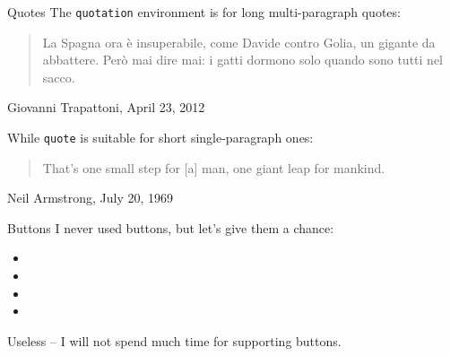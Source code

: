 \begin{frame}{Quotes}
The \texttt{quotation} environment is for long multi-paragraph quotes:

\begin{quotation}
La Spagna ora è insuperabile, come Davide contro Golia, un gigante da abbattere.
Però mai dire mai: i gatti dormono solo quando sono tutti nel sacco.
\end{quotation}

Giovanni Trapattoni, April 23, 2012

\bigskip

While \texttt{quote} is suitable for short single-paragraph ones:

\begin{quote}
That's one small step for [a] man, one giant leap for mankind.
\end{quote}

Neil Armstrong, July 20, 1969
\end{frame}

\begin{frame}{Buttons}
I never used buttons, but let's give them a chance:

\begin{itemize}
\item {}
\item {}
\item {}
\item {}
\end{itemize}

Useless -- I will not spend much time for supporting buttons.
\end{frame}
